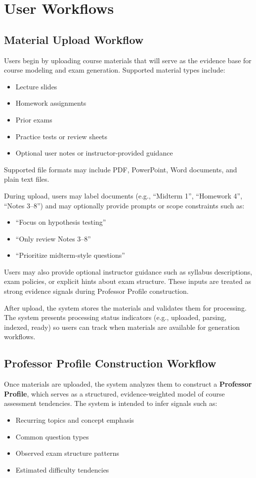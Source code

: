 \documentclass[11pt]{article}
\begin{document}
\section{User Workflows}

\subsection{Material Upload Workflow}
Users begin by uploading course materials that will serve as the evidence base for course modeling and exam generation. Supported material types include:
\begin{itemize}
\item Lecture slides
\item Homework assignments
\item Prior exams
\item Practice tests or review sheets
\item Optional user notes or instructor-provided guidance
\end{itemize}

Supported file formats may include PDF, PowerPoint, Word documents, and plain text files.

During upload, users may label documents (e.g., ``Midterm 1'', ``Homework 4'', ``Notes 3--8'') and may optionally provide prompts or scope constraints such as:
\begin{itemize}
\item ``Focus on hypothesis testing''
\item ``Only review Notes 3--8''
\item ``Prioritize midterm-style questions''
\end{itemize}

Users may also provide optional instructor guidance such as syllabus descriptions, exam policies, or explicit hints about exam structure. These inputs are treated as strong evidence signals during Professor Profile construction.

After upload, the system stores the materials and validates them for processing. The system presents processing status indicators (e.g., uploaded, parsing, indexed, ready) so users can track when materials are available for generation workflows.

\subsection{Professor Profile Construction Workflow}
Once materials are uploaded, the system analyzes them to construct a \textbf{Professor Profile}, which serves as a structured, evidence-weighted model of course assessment tendencies. The system is intended to infer signals such as:
\begin{itemize}
\item Recurring topics and concept emphasis
\item Common question types
\item Observed exam structure patterns
\item Estimated difficulty tendencies
\end{itemize}
\end{document}
